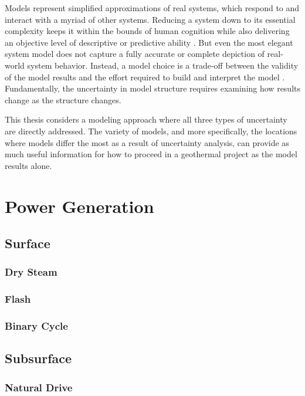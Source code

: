 Models represent simplified approximations of real systems, which respond to and interact with a myriad of other systems. Reducing a system down to its essential complexity keeps it within the bounds of human cognition while also delivering an objective level of descriptive or predictive ability \citep[~p. 306]{crawley_system_2015}. But even the most elegant system model does not capture a fully accurate or complete depiction of real-world system behavior. Instead, a model choice is a trade-off between the validity of the model results and the effort required to build and interpret the model \citep[~p. 23]{morgan_best_2009}. Fundamentally, the uncertainty in model structure requires examining how results change as the structure changes.

This thesis considers a modeling approach where all three types of uncertainty are directly addressed. The variety of models, and more specifically, the locations where models differ the most as a result of uncertainty analysis, can provide as much useful information for how to proceed in a geothermal project as the model results alone.

\section{Power Generation}\label{ch2:elec}

\subsection{Surface}

\subsubsection{Dry Steam}

\subsubsection{Flash}

\subsubsection{Binary Cycle}

\subsection{Subsurface}

\subsubsection{Natural Drive}

